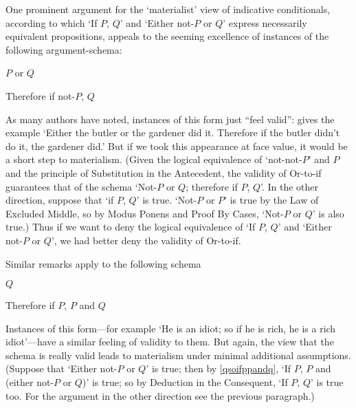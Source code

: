 \documentclass[If.tex]{subfiles}
\begin{document}
One prominent argument for the ‘materialist’ view of indicative conditionals, according to which ‘If $P$, $Q$’ and ‘Either not-$P$ or $Q$’ express necessarily equivalent propositions, appeals to the seeming excellence of instances of the following argument-schema:
\begin{prop}
	\sitem[Or-to-if] \label{ortoif}
	$P$ or $Q$
	
	Therefore if not-$P$, $Q$
\end{prop}
As many authors have noted, instances of this form just “feel valid”: \citet{StalnakerIC} gives the example ‘Either the butler or the gardener did it.  Therefore if the butler didn't do it, the gardener did.’  But if we took this appearance at face value, it would be a short step to materialism.  (Given the logical equivalence of ‘not-not-$P$’ and $P$ and the principle of Substitution in the Antecedent, the validity of Or-to-if guarantees that of the schema ‘Not-$P$ or $Q$; therefore if $P$, $Q$’.  In the other direction, suppose that ‘if $P$, $Q$’ is true.   ‘Not-$P$ or $P$’ is true by the Law of Excluded Middle, so by Modus Ponens and Proof By Cases, ‘Not-$P$ or $Q$’ is also true.)  Thus if we want to deny the logical equivalence of ‘If $P$, $Q$’ and ‘Either not-$P$ or $Q$’, we had better deny the validity of Or-to-if.  

Similar remarks apply to the following schema
\begin{prop}
	 \label{qsoifppandq}
	$Q$
	
	Therefore if $P$, $P$ and $Q$
\end{prop}
Instances of this form---for example ‘He is an idiot; so if he is rich, he is a rich idiot’---have a similar feeling of validity to them.  But again, the view that the schema is really valid leads to materialism under minimal additional assumptions.  (Suppose that ‘Either not-$P$ or $Q$’ is true; then by \ref{qsoifppandq}, ‘If $P$, $P$ and (either not-$P$ or $Q$)’ is true; so by Deduction in the Consequent, ‘If $P$, $Q$’ is true too.  For the argument in the other direction see the previous paragraph.)  
\end{document}
